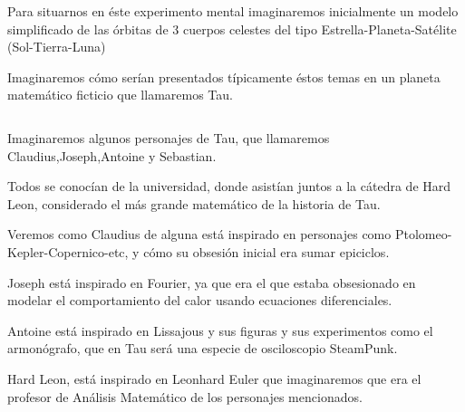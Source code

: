 \documentclass[preview]{standalone}
\begin{document}
\begin{center}
Para situarnos en éste experimento mental imaginaremos inicialmente un modelo simplificado de las órbitas de 3 cuerpos celestes del tipo Estrella-Planeta-Satélite (Sol-Tierra-Luna) 

$$ $$
Imaginaremos cómo serían presentados típicamente éstos temas en un planeta matemático ficticio que llamaremos Tau. 

$$ $$ 

Imaginaremos algunos personajes  de Tau, que llamaremos Claudius,Joseph,Antoine y Sebastian. 

Todos se conocían de la universidad, donde asistían juntos a la cátedra de Hard Leon, considerado el más grande matemático de la historia de Tau.

Veremos como Claudius de alguna está inspirado en personajes como Ptolomeo-Kepler-Copernico-etc, y cómo su obsesión inicial era sumar epiciclos.  

Joseph está inspirado en Fourier, ya que era el que estaba obsesionado en modelar el comportamiento del calor usando ecuaciones diferenciales.  

Antoine está inspirado en Lissajous y sus figuras y sus experimentos como el armonógrafo, que en Tau será una especie de osciloscopio SteamPunk.

Hard Leon, está inspirado en Leonhard Euler que imaginaremos que era el profesor de Análisis Matemático de los personajes mencionados.

$$ $$
\end{center}
\end{document}
